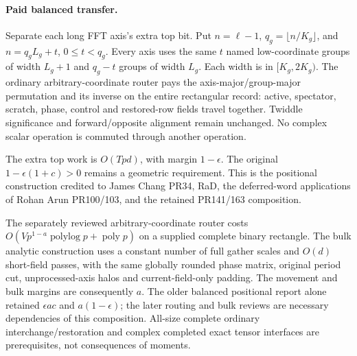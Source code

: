\documentclass[11pt]{article}
\begin{document}
\paragraph{Paid balanced transfer.}
Separate each long FFT axis's extra top bit. Put $n=\ell-1$,
$q_g=\lfloor n/K_g\rfloor$, and $n=q_gL_g+t$, $0\le t<q_g$.
Every axis uses the same $t$ named low-coordinate groups of width
$L_g+1$ and $q_g-t$ groups of width $L_g$. Each width is in
$[K_g,2K_g)$. The ordinary arbitrary-coordinate router pays the
axis-major/group-major permutation and its inverse on the entire
rectangular record: active, spectator, scratch, phase, control and
restored-row fields travel together. Twiddle significance and
forward/opposite alignment remain unchanged. No complex scalar operation
is commuted through another operation.

The extra top work is $O(Tpd)$, with margin $1-\epsilon$.
The original $1-\epsilon(1+c)>0$ remains a geometric requirement.
This is the positional construction credited to James Chang PR34,
RaD, the deferred-word applications of Rohan Arun PR100/103,
and the retained PR141/163 composition.

The separately reviewed arbitrary-coordinate router costs
$O(Vp^{1-a}\operatorname{polylog}p+\operatorname{poly}p)$ on a supplied
complete binary rectangle. The bulk analytic construction uses a
constant number of full gather scales and $O(d)$ short-field passes,
with the same globally rounded phase matrix, original period cut,
unprocessed-axis halos and current-field-only padding. The movement
and bulk margins are consequently $a$. The older balanced positional
report alone retained $\epsilon ac$ and $a(1-\epsilon)$; the later
routing and bulk reviews are necessary dependencies of this composition.
All-size complete ordinary interchange/restoration and complex completed
exact tensor interfaces are prerequisites, not consequences of moments.
\end{document}
